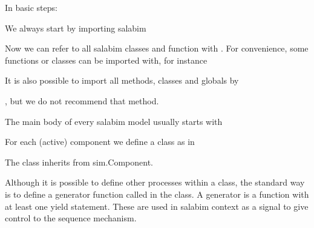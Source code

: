 \documentclass[letterpaper,10pt,english]{sphinxmanual}
\begin{document}
In basic steps:

We always start by importing salabim

\begin{sphinxVerbatim}[commandchars=\\\{\}]
   
\end{sphinxVerbatim}

Now we can refer to all salabim classes and function with .
For convenience, some functions or classes can be imported with, for instance

\begin{sphinxVerbatim}[commandchars=\\\{\}]
     
\end{sphinxVerbatim}

It is also possible to import all methods, classes and globals by

\begin{sphinxVerbatim}[commandchars=\\\{\}]
   
\end{sphinxVerbatim}

, but we do not recommend that method.

The main body of every salabim model usually starts with

\begin{sphinxVerbatim}[commandchars=\\\{\}]
  
\end{sphinxVerbatim}

For each (active) component we define a class as in

\begin{sphinxVerbatim}[commandchars=\\\{\}]
 
\end{sphinxVerbatim}

The class inherits from sim.Component.

Although it is possible to define other processes within a class,
the standard way is to define a generator function called  in the class.
A generator is a function with at least one yield statement. These are used in salabim context as
a signal to give control to the sequence mechanism.
\end{document}
